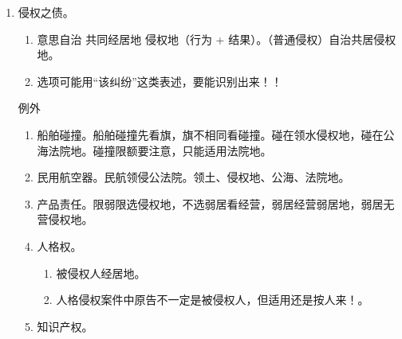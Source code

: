 \begin{enumerate}
\begin{enumerate}
\begin{kk}{3 种合同允许但限制意思自治}
\begin{enumerate}
\begin{enumerate}
                            \item 只能由消费者选 \yjt 不选 \yjt 消费者经居地有没有营业 \yjt 提供地。
                            \item {}。
                          \end{enumerate}
                    \item 劳动合同。劳动合同禁选法，工地确定工作地，派遣还可派出地。工地不定营业地。
                          \begin{enumerate}
                            \item 劳动聘用。工作地 \yjt 主营业地。
                            \item 劳务派遣。工作地 \hz 派出地 \yjt 主营业地。
                          \end{enumerate}
                  \end{enumerate}
                \end{kk}
          \item 侵权之债。
                \begin{enumerate}
                  \item 意思自治 \yjt 共同经居地 \yjt 侵权地（行为 + 结果）。（普通侵权）自治共居侵权地。
                  \item 选项可能用“该纠纷”这类表述，要能识别出来！！
                \end{enumerate}
                \begin{kk}{例外}
                  \begin{enumerate}
                    \item 船舶碰撞。船舶碰撞先看旗，旗不相同看碰撞。碰在领水侵权地，碰在公海法院地。碰撞限额要注意，只能适用法院地。
                    \item 民用航空器。民航领侵公法院。领土、侵权地、公海、法院地。
                    \item 产品责任。限弱限选侵权地，不选弱居看经营，弱居经营弱居地，弱居无营侵权地。
                    \item 人格权。
                          \begin{enumerate}
                            \item 被侵权人经居地。
                            \item 人格侵权案件中原告不一定是被侵权人，但适用还是按人来！。
                          \end{enumerate}
                    \item 知识产权。

\end{enumerate}
\end{kk}
\end{enumerate}
\end{enumerate}
